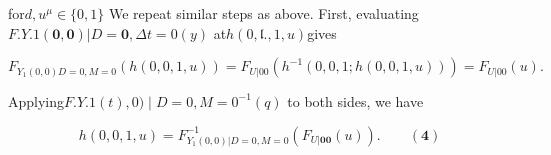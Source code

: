 \documentclass{article}
\begin{document}
for$d, u ^ { \mu } \in \{ 0, 1 \}$ We repeat similar steps as above. First, evaluating$F . { Y . { 1 } ( \mathbf { 0 }, \mathbf { 0 } ) | D = \mathbf { 0 }, \Delta t = 0 } ( y )$
at$h ( 0, \mathfrak { l } . { \! }, 1, u )$gives


\begin{equation}
F _ { Y _ { 1 } ( 0, 0 ) D = 0, M = 0 } ( h ( 0, 0, 1, u ) ) = F _ { U | 0 0 } ( h ^ { - 1 } ( 0, 0, 1 ; h ( 0, 0, 1, u ) ) ) = F _ { U | 0 0 } ( u ).
\end{equation}


Applying$F . { Y . { 1 } ( t ), 0 ) \mid D = 0, M = 0 } ^ { - 1 } ( q )$ to both sides, we have


\begin{equation}
h ( 0, 0, 1, u ) = F _ { Y _ { 1 } ( 0, 0 ) | D = 0, M = 0 } ^ { - 1 } ( F _ { U | \mathbf { 0 0 } } ( u ) ). \qquad ( \mathbf { 4 } )
\end{equation}
\end{document}
